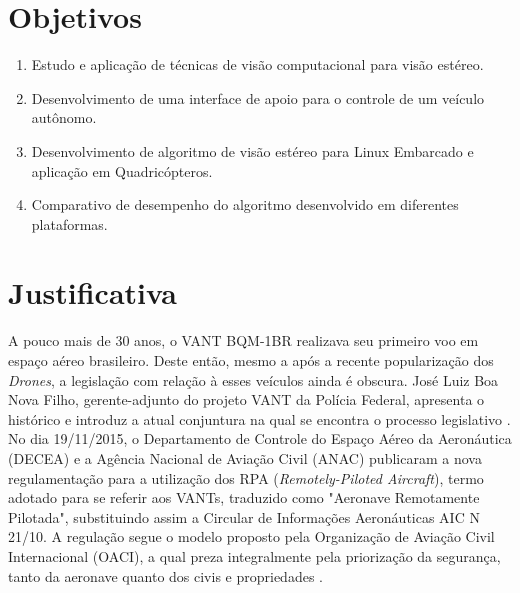 \section{Objetivos}


\begin{enumerate}
	\item Estudo e aplicação de técnicas de visão computacional para visão estéreo.
	\item Desenvolvimento de uma interface de apoio para o controle de um veículo autônomo.
	\item Desenvolvimento de algoritmo de visão estéreo para Linux Embarcado e aplicação em Quadricópteros.
	\item Comparativo de desempenho do algoritmo desenvolvido em diferentes plataformas.
\end{enumerate}

\section{Justificativa}

A pouco mais de 30 anos, o VANT BQM-1BR realizava seu primeiro voo em espaço aéreo brasileiro. Deste então, mesmo a após a recente popularização dos \textit{Drones}, a legislação com relação à esses veículos ainda é obscura. José Luiz Boa Nova Filho, gerente-adjunto do projeto VANT da Polícia Federal, apresenta o histórico e introduz a atual conjuntura na qual se encontra o processo legislativo \cite{Filho2014}. No dia 19/11/2015, o Departamento de Controle do Espaço Aéreo da Aeronáutica (DECEA) e a Agência Nacional de Aviação Civil (ANAC) publicaram a nova regulamentação para a utilização dos RPA (\textit{Remotely-Piloted Aircraft}), termo adotado para se referir aos VANTs, traduzido como "Aeronave Remotamente Pilotada", substituindo assim a Circular de Informações Aeronáuticas AIC N 21/10. A regulação segue o modelo proposto pela Organização de Aviação Civil Internacional (OACI), a qual preza integralmente pela priorização da segurança, tanto da aeronave quanto dos civis e propriedades \cite{DECEA2015}. 

